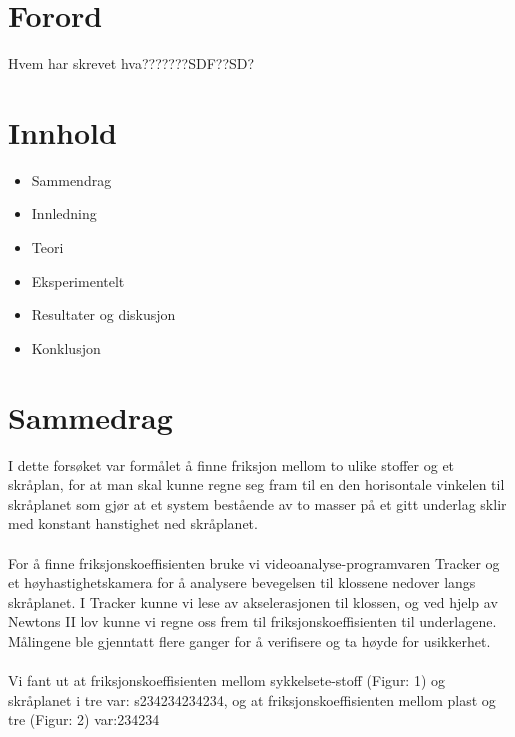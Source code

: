 \documentclass[10pt,a4paper]{report}
\author{Finn Matras}
\begin{document}
\chapter*{Forord}
Hvem har skrevet hva???????SDF??SD?

\chapter*{Innhold}
\begin{itemize}
\item Sammendrag
\item Innledning
\item Teori
\item Eksperimentelt
\item Resultater og diskusjon
\item Konklusjon
\end{itemize}

\chapter*{Sammedrag}
I dette forsøket var formålet å finne friksjon mellom to ulike stoffer og et skråplan, for at man skal kunne regne seg fram til en den horisontale vinkelen til skråplanet som gjør at et system bestående av to masser på et gitt underlag sklir med konstant hanstighet ned skråplanet.\\
\\For å finne friksjonskoeffisienten bruke vi videoanalyse-programvaren Tracker og et høyhastighetskamera for å analysere bevegelsen til klossene nedover langs skråplanet. I Tracker kunne vi lese av akselerasjonen til klossen, og ved hjelp av Newtons II lov kunne vi regne oss frem til friksjonskoeffisienten til underlagene. Målingene ble gjenntatt flere ganger for å verifisere og ta høyde for usikkerhet.\\
\\Vi fant ut at friksjonskoeffisienten mellom sykkelsete-stoff (Figur: 1) og skråplanet i tre var: s234234234234, og at friksjonskoeffisienten mellom plast og tre (Figur: 2) var:234234
\end{document}

